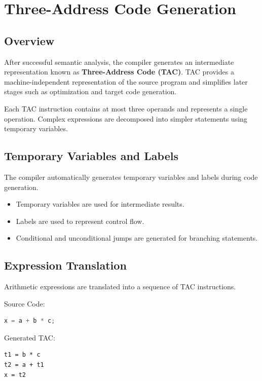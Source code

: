 \documentclass[12pt,a4paper]{report}
\begin{document}
\chapter{Three-Address Code Generation}

\section{Overview}

After successful semantic analysis, the compiler generates an intermediate representation known as \textbf{Three-Address Code (TAC)}. TAC provides a machine-independent representation of the source program and simplifies later stages such as optimization and target code generation.

Each TAC instruction contains at most three operands and represents a single operation. Complex expressions are decomposed into simpler statements using temporary variables.

\section{Temporary Variables and Labels}

The compiler automatically generates temporary variables and labels during code generation.

\begin{itemize}
    \item Temporary variables are used for intermediate results.
    \item Labels are used to represent control flow.
    \item Conditional and unconditional jumps are generated for branching statements.
\end{itemize}

\section{Expression Translation}

Arithmetic expressions are translated into a sequence of TAC instructions.

Source Code:

\begin{lstlisting}[language=C]
x = a + b * c;
\end{lstlisting}

Generated TAC:

\begin{lstlisting}
t1 = b * c
t2 = a + t1
x = t2
\end{lstlisting}
\end{document}
